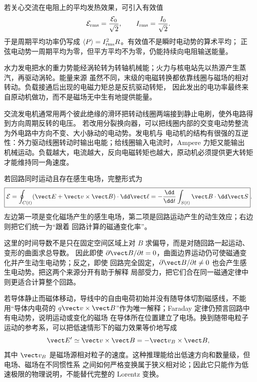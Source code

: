 若关心交流在电阻上的平均发热效果，可引入有效值
\begin{equation}
  \mathcal E_{\rm rms}=\frac{\mathcal E_0}{\sqrt2},
  \qquad I_{\rm rms}=\frac{I_0}{\sqrt2}.
\end{equation}
于是周期平均功率仍写成 $\langle P\rangle=I_{\rm rms}^2R$。有效值不是瞬时电动势的算术平均；
正弦电动势一周期平均为零，但平方平均不为零，仍能持续向电阻输送能量。

\generatorFigureFaithful

水力发电把水的重力势能经涡轮转为转轴机械能；火力与核电站先以热源产生蒸汽，再驱动涡轮。能量来源
虽然不同，末级的电磁转换都依靠线圈与磁场的相对转动。负载接通后出现的电磁力矩总是反抗驱动转矩，
因此发出的电功率最终来自原动机做功，而不是磁场无中生有地提供能量。

交流发电机通常用两个彼此绝缘的滑环把转动线圈两端接到静止电刷，使外电路得到方向周期反转的电压。
若改用分裂换向器，可以把线圈内部的交变电动势整流为外电路中方向不变、大小脉动的电动势。发电机与
电动机的结构有很强的互逆性：外力驱动线圈转动时输出电能；给线圈输入电流时，Ampere 力矩又能输出
机械运动。负载越大，电流越大，反向电磁转矩也越大，原动机必须提供更大转矩才能维持同一角速度。

若回路同时运动且存在感生电场，完整形式为
\begin{equation}
  \boxed{\mathcal E=\oint_{C(t)}(\vect E+\vect v\times\vect B)\cdot\dd\vect\ell
  =-\frac{\dd}{\dd t}\int_{S(t)}\vect B\cdot\dd\vect S}.
\end{equation}
左边第一项是变化磁场产生的感生电场，第二项是回路运动产生的动生效应；右边则把它们统一为“跟着
回路计算的磁通变化率”。

这里的时间导数不是只在固定空间区域上对 $B$ 求偏导，而是对随回路一起运动、变形的曲面求总导数。
因此即使 $\partial\vect B/\partial t=0$，曲面边界运动仍可使磁通变化并产生动生电动势；反之，即使
回路完全固定，$\partial\vect B/\partial t\ne0$ 也会产生感生电动势。把这两个来源分开有助于解释
局部受力，把它们合在同一磁通定律中则更适合计算整个回路。

若导体静止而磁体移动，导线中的自由电荷初始并没有随导体切割磁感线，不能用“导体内电荷的
$q\vect v\times\vect B$”作为唯一解释；Faraday 定律仍预言回路中有电动势，说明运动或变化的磁场
在导体所在位置建立了电场。换到随带电粒子运动的参考系，可以把低速情形下的磁力效果等价地写成
\begin{equation}
  \vect E'\simeq\vect v\times\vect B=-\vect v_B\times\vect B,
\end{equation}
其中 $\vect v_B$ 是磁场源相对粒子的速度。这种推理能给出低速方向和数量级，但电场、磁场在不同惯性系
之间如何严格变换属于狭义相对论；因此它只能作为低速极限的物理说明，不能替代完整的 Lorentz 变换。

